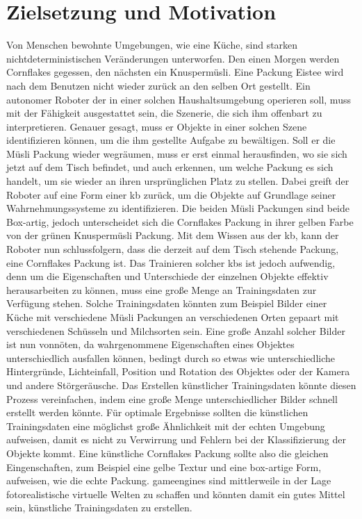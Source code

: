 \graphicspath{{./images/}}      
\def\CHAPTERONE{./chapters/Chapter-1} 

\chapter{Zielsetzung und Motivation}
\label{chap:motivation}
%	

\glsresetall

Von Menschen bewohnte Umgebungen, wie eine Küche, sind starken nichtdeterministischen Veränderungen unterworfen. Den einen Morgen werden Cornflakes gegessen, den nächsten ein Knuspermüsli. Eine Packung Eistee wird nach dem Benutzen nicht wieder zurück an den selben Ort gestellt. Ein autonomer Roboter der in einer solchen Haushaltsumgebung operieren soll, muss mit der Fähigkeit ausgestattet sein, die Szenerie, die sich ihm offenbart zu interpretieren. Genauer gesagt, muss er Objekte in einer solchen Szene identifizieren können, um die ihm gestellte Aufgabe zu bewältigen. Soll er die Müsli Packung wieder wegräumen, muss er erst einmal herausfinden, wo sie sich jetzt auf dem Tisch befindet, und auch erkennen, um welche Packung es sich handelt, um sie wieder an ihren ursprünglichen Platz zu stellen. Dabei greift der Roboter auf eine Form einer \gls{kb} zurück, um die Objekte auf Grundlage seiner Wahrnehmungssysteme zu identifizieren. Die beiden Müsli Packungen sind beide Box-artig, jedoch unterscheidet sich die Cornflakes Packung in ihrer gelben Farbe von der grünen Knuspermüsli Packung. Mit dem Wissen aus der \gls{kb}, kann der Roboter nun schlussfolgern, dass die derzeit auf dem Tisch stehende Packung, eine Cornflakes Packung ist. Das Trainieren solcher \glspl{kb} ist jedoch aufwendig, denn um die Eigenschaften und Unterschiede der einzelnen Objekte effektiv herausarbeiten zu können, muss eine große Menge an Trainingsdaten zur Verfügung stehen. Solche Trainingsdaten könnten zum Beispiel Bilder einer Küche mit verschiedene Müsli Packungen an verschiedenen Orten gepaart mit verschiedenen Schüsseln und Milchsorten sein. Eine große Anzahl solcher Bilder ist nun vonnöten, da wahrgenommene Eigenschaften eines Objektes unterschiedlich ausfallen können, bedingt durch so etwas wie unterschiedliche Hintergründe, Lichteinfall, Position und Rotation des Objektes oder der Kamera und andere Störgeräusche. \newline
Das Erstellen künstlicher Trainingsdaten könnte diesen Prozess vereinfachen, indem eine große Menge unterschiedlicher Bilder schnell erstellt werden könnte. Für optimale Ergebnisse sollten die künstlichen Trainingsdaten eine möglichst große Ähnlichkeit mit der echten Umgebung aufweisen, damit es nicht zu Verwirrung und Fehlern bei der Klassifizierung der Objekte kommt. Eine künstliche Cornflakes Packung sollte also die gleichen Eingenschaften, zum Beispiel eine gelbe Textur und eine box-artige Form, aufweisen, wie die echte Packung. \glspl{gameengine} sind mittlerweile in der Lage fotorealistische virtuelle Welten zu schaffen und könnten damit ein gutes Mittel sein, künstliche Trainingsdaten zu erstellen.  

